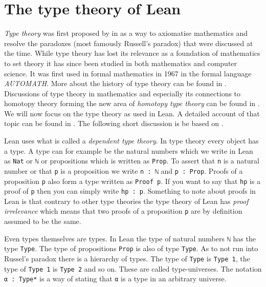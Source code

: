\section{The type theory of Lean}

\emph{Type theory} was first proposed by  in \citeyear{Russell1908} \cite{Russell1908} as a way to axiomatise mathematics and resolve the paradoxes (most famously Russell's paradox) that were discussed at the time. 
While type theory has lost its relevance as a foundation of mathematics to set theory it has since been studied in both mathematics and computer science. 
It was first used in formal mathematics in 1967 in the formal language \emph{AUTOMATH}. 
More about the history of type theory can be found in \cite{Kamareddine2004}. 
Discussions of type theory in mathematics and especially its connections to homotopy theory forming the new area of \emph{homotopy type theory} can be found in \cite{hottbook}.
We will now focus on the type theory as used in Lean.
A detailed account of that topic can be found in \cite{Carneiro2019}. 
The following short discussion is be based on \cite{Avigad2024}. 

Lean uses what is called a \emph{dependent type theory}.
In type theory every object has a type. 
A type can for example be the natural numbers which we write in Lean as \lstinline{Nat} or \lstinline{ℕ} or propositions which is written as \lstinline{Prop}.
To assert that \lstinline{n} is a natural number or that \lstinline{p} is a proposition we write \lstinline{n : ℕ} and \lstinline{p : Prop}. 
Proofs of a proposition \lstinline{p} also form a type written as \lstinline{Proof p}.
If you want to say that \lstinline{hp} is a proof of \lstinline{p} then you can simply write \lstinline{hp : p}.
Something to note about proofs in Lean is that contrary to other type theories the type theory of Lean has \emph{proof irrelevance} which means that two proofs of a proposition \lstinline{p} are by definition assumed to be the same.

Even types themselves are types. 
In Lean the type of natural numbers \lstinline{ℕ} has the type \lstinline{Type}. 
The type of propositions \lstinline{Prop} is also of type \lstinline{Type}.
As to not run into Russel's paradox there is a hierarchy of types. 
The type of \lstinline{Type} is \lstinline{Type 1}, the type of \lstinline{Type 1} is \lstinline{Type 2} and so on.
These are called type-universes. 
The notation \lstinline{α : Type*} is a way of stating that \lstinline{α} is a type in an arbitrary universe.


